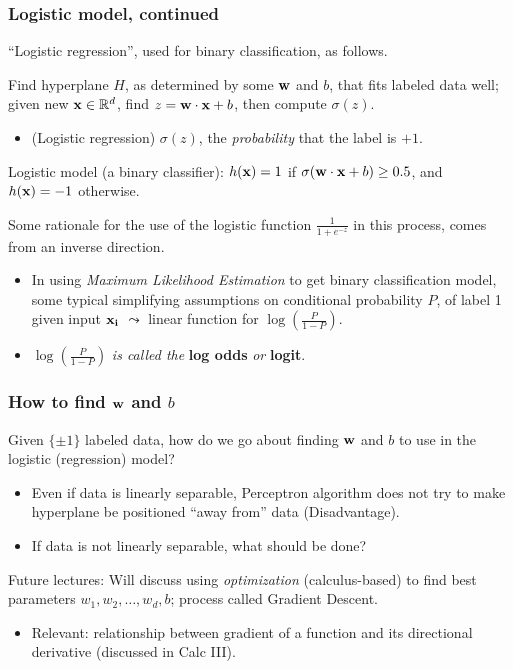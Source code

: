 \documentclass{beamer}
\theoremstyle{example}
\begin{document}
\begin{frame}
\frametitle{Logistic model, continued}
    ``Logistic regression'', used for binary classification, as follows.
    
    Find hyperplane $H$, as determined by some ${\bf w}$ and $b$, that fits labeled data well; given new ${\bf x}\in\mathbb R^d$, find $z = {\bf w}\cdot{\bf x}+b$, then compute $\sigma(z)$. 
    \begin{itemize}
        \item (Logistic regression) $\sigma(z)$, the \textit{probability} that the label is $+1$.
    \end{itemize}
    
    Logistic model (a binary classifier): $h({\bf x})=1$ if $\sigma({\bf w}\cdot{\bf x}+b) \ge 0.5$, and $h({\bf x})=-1$ otherwise. 
    
    \pause 
    Some rationale for the use of the logistic function $\frac{1}{1+e^{-z}}$ in this process, comes from an inverse direction. 
    \begin{itemize}
        \item In using \textit{Maximum Likelihood Estimation} to get binary classification model, some typical simplifying assumptions on conditional probability $P$, of label 1 given input ${\bf x_i}$ \qquad $\leadsto$ linear function for $\log\left(\frac{P}{1-P}\right)$. \newline 
        \item $\log\left(\frac{P}{1-P}\right)$ \textit{is called the } \textbf{log odds } \textit{or } \textbf{logit}.
    \end{itemize}

\end{frame}
\begin{frame}
    \frametitle{How to find ${\bf w}$ and $b$}
    Given $\{\pm1\}$ labeled data, how do we go about finding ${\bf w}$ and $b$ to use in the logistic (regression) model?

    \pause
    \begin{itemize}
        \item Even if data is linearly separable, Perceptron algorithm does not try to make hyperplane be positioned ``away from'' data (Disadvantage). 
        \item If data is not linearly separable, what should be done?
    \end{itemize}

    \pause
    Future lectures: Will discuss using \emph{optimization} (calculus-based) to find best parameters $w_1,w_2,\ldots,w_d,b$; process called Gradient Descent. 
    \pause
    \begin{itemize}
        \item Relevant: relationship between {gradient} of a function and its {directional derivative} (discussed in Calc III).
    \end{itemize}
\end{frame}
\end{document}
